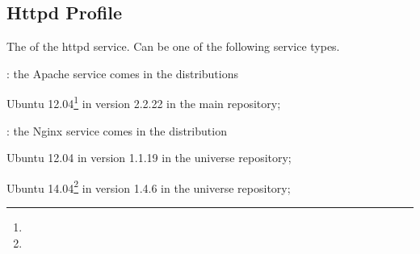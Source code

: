 \label{sec:httpd_profile}
\subsection{Httpd Profile}


The  of the httpd service. Can be one of the following 
service types.
\begin{asparaitem}
%
\item[\qcode{apache}:] 
the Apache service comes in the distributions 
\begin{compactitem}
\item[\TheDistribution{ubuntu}] 
Ubuntu 12.04\footnote{\TheUbuntuPreciseLTSDate} in version 2.2.22 in the main repository;
%
\end{compactitem}
%
\item[\qcode{nginx}:] 
the Nginx service comes in the distribution
\begin{compactitem}
\item[\TheDistribution{ubuntu}] 
Ubuntu 12.04 in version 1.1.19 in the universe repository;
\item[\TheDistribution{ubuntu}] 
Ubuntu 14.04\footnote{\TheUbuntuTrustyLTSDate} in version 1.4.6 in the universe repository;
\end{compactitem}
%
\end{asparaitem}

